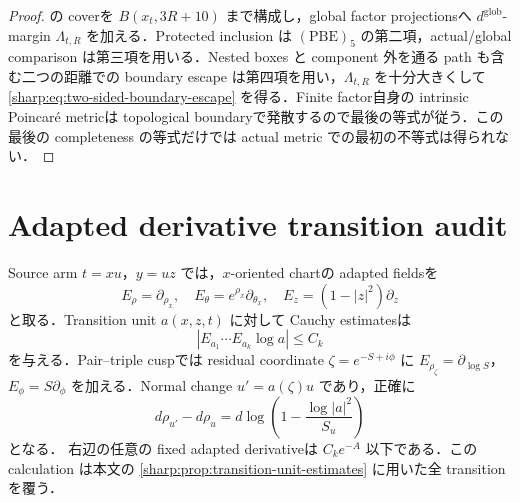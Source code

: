 \documentclass[a4paper,11pt]{ltjsarticle}
\numberwithin{equation}{section}
\theoremstyle{plain}
\theoremstyle{definition}
\theoremstyle{remark}
\begin{document}
\begin{proof}
 の coverを $B(x_t,3R+10)$ まで構成し，global factor projectionsへ $d^{\mathrm{glob}}$-margin $\Lambda_{t,R}$ を加える．Protected inclusion は $\mathrm{(PBE)}_5$ の第二項，actual/global comparison は第三項を用いる．Nested boxes と component 外を通る path も含む二つの距離での boundary escape は第四項を用い，$\Lambda_{t,R}$ を十分大きくして \eqref{sharp:eq:two-sided-boundary-escape} を得る．Finite factor自身の intrinsic Poincar\'e metricは topological boundaryで発散するので最後の等式が従う．この最後の completeness の等式だけでは actual metric での最初の不等式は得られない．
\end{proof}

\section{Adapted derivative transition audit}\label{sharp:app:adapted-transition-audit}

Source arm $t=xu$，$y=uz$ では，$x$-oriented chartの adapted fieldsを
\[
 E_\rho=\partial_{\rho_x},\quad
 E_\theta=e^{\rho_x}\partial_{\theta_x},\quad
 E_z=(1-|z|^2)\partial_z
\]
と取る．Transition unit $a(x,z,t)$ に対して Cauchy estimatesは
\[
 |E_{a_1}\cdots E_{a_k}\log a|\le C_k
\]
を与える．Pair--triple cuspでは residual coordinate $\zeta=e^{-S+i\phi}$ に
$E_{\rho_\zeta}=\partial_{\log S}$，$E_\phi=S\partial_\phi$ を加える．Normal change
$u'=a(\zeta)u$ であり，正確に
\begin{equation}\label{sharp:eq:appendix-rho-transition}
 d\rho_{u'}-d\rho_u
 =d\log\left(1-\frac{\log|a|^2}{S_u}\right)
\end{equation}
となる．
右辺の任意の fixed adapted derivativeは $C_ke^{-A}$ 以下である．この calculation は本文の \cref{sharp:prop:transition-unit-estimates} に用いた全 transitionを覆う．
\end{document}
